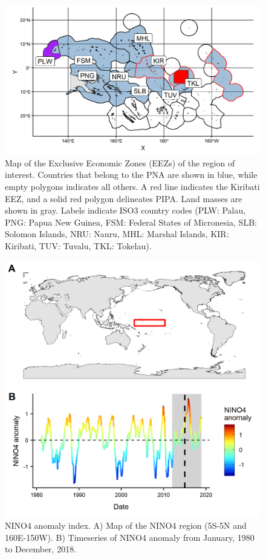 \documentclass[9p,twocolumn,twoside,lineno]{pnas-new}
\begin{document}
\begin{figure}[H]
\centering
\includegraphics{img/PNA_map.png}
\caption{\label{fig:PNA_map}Map of the Exclusive Economic Zones (EEZs) of the region of interest. Countries that belong to the PNA are shown in blue, while empty polygons indicates all others. A red line indicates the Kiribati EEZ, and a solid red polygon delineates PIPA. Land masses are shown in gray. Labels indicate ISO3 country codes (PLW: Palau, PNG: Papua New Guinea, FSM: Federal States of Micronesia, SLB: Solomon Islands, NRU: Nauru, MHL: Marshal Islands, KIR: Kiribati, TUV: Tuvalu, TKL: Tokelau).}
\end{figure}

\begin{figure}[H]
\centering
\includegraphics{img/nino_plot.png}
\caption{\label{fig:nino_plot}NINO4 anomaly index. A) Map of the NINO4 region (5S-5N and 160E-150W). B) Timeseries of NINO4 anomaly from January, 1980 to December, 2018.}
\end{figure}
\end{document}
